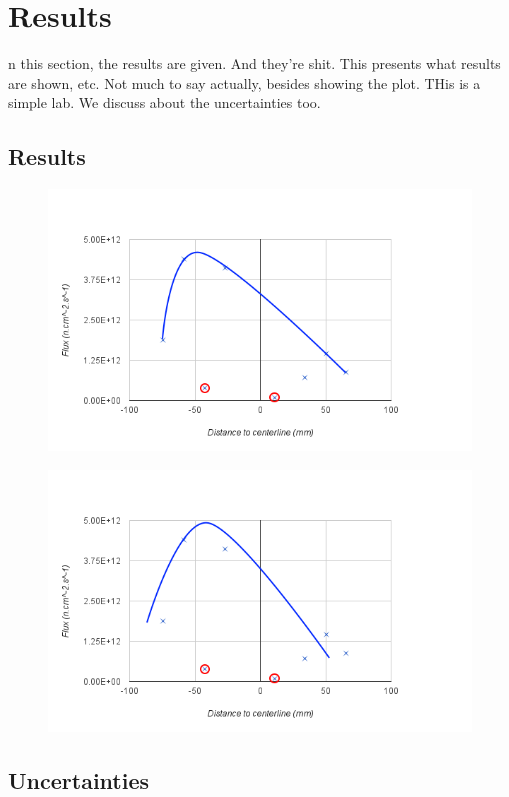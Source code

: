 %
%
\let\textcircled=\pgftextcircled
\chapter{Results}
\label{chap:result}

n this section, the results are given. And they're shit. This presents what results are shown, etc. Not much to say actually, besides showing the plot. THis is a simple lab. We discuss about the uncertainties too.

\section{Results}

\begin{figure}[t!]
	\centering
	\includegraphics[height=0.4\textheight]{fig02/flux1.png}
	\label{fig:flux1}
\end{figure}

\begin{figure}[t!]
	\centering
	\includegraphics[height=0.4\textheight]{fig02/flux2.png}
	\label{fig:flux2}
\end{figure}

\section{Uncertainties}



